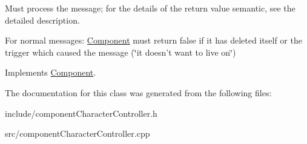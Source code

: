 \-Must process the message; for the details of the return value semantic, see the detailed description. 

\-For normal messages\-: \hyperlink{classComponent}{\-Component} must return false if it has deleted itself or the trigger which caused the message (\char`\"{}it doesn't want to live on\char`\"{}) 

\-Implements \hyperlink{classComponent_a5c34b629ba4b6e2925045ef965d4d560}{\-Component}.



\-The documentation for this class was generated from the following files\-:\begin{DoxyCompactItemize}
\item 
include/component\-Character\-Controller.\-h\item 
src/component\-Character\-Controller.\-cpp\end{DoxyCompactItemize}

